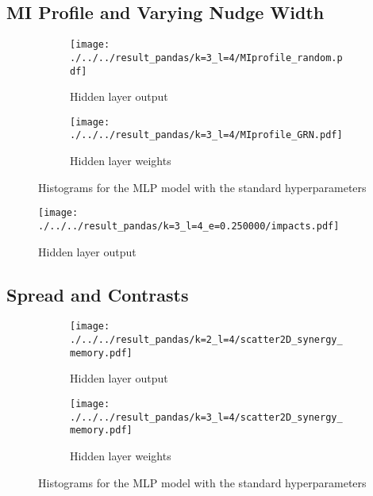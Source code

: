 \documentclass[../main.tex]{subfiles}
\begin{document}

\subsection{MI Profile and Varying Nudge Width}

\begin{figure}[H]
    \centering
    \begin{subfigure}[b]{0.4\textwidth}
        \texttt{[image: ./../../result\_pandas/k=3\_l=4/MIprofile\_random.pdf]}
        \caption{Hidden layer output}
    \end{subfigure}
    \begin{subfigure}[b]{0.4\textwidth}
        \texttt{[image: ./../../result\_pandas/k=3\_l=4/MIprofile\_GRN.pdf]}
        \caption{Hidden layer weights}
    \end{subfigure}
    \caption{Histograms for the MLP model with the standard hyperparameters}
    \label{fig:regular_hid}
\end{figure}

\begin{figure}[H]
    \centering
    \texttt{[image: ./../../result\_pandas/k=3\_l=4\_e=0.250000/impacts.pdf]}
    \caption{Hidden layer output}
    \label{fig:ugh}
\end{figure}

\subsection{Spread and Contrasts}


\begin{figure}[H]
    \centering
    \begin{subfigure}[b]{0.4\textwidth}
        \texttt{[image: ./../../result\_pandas/k=2\_l=4/scatter2D\_synergy\_memory.pdf]}
        \caption{Hidden layer output}
    \end{subfigure}
    \begin{subfigure}[b]{0.4\textwidth}
        \texttt{[image: ./../../result\_pandas/k=3\_l=4/scatter2D\_synergy\_memory.pdf]}
        \caption{Hidden layer weights}
    \end{subfigure}
    \caption{Histograms for the MLP model with the standard hyperparameters}
    \label{fig:regular_hid}
\end{figure}
\end{document}
